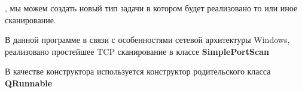 , мы можем создать новый тип задачи в котором будет реализовано то или
иное сканирование.

В данной программе в связи с особенностями сетевой архитектуры Windows,
реализовано простейшее TCP сканирование в классе \textbf{SimplePortScan}

В качестве конструктора используется конструктор родительского класса
\textbf{QRunnable}

